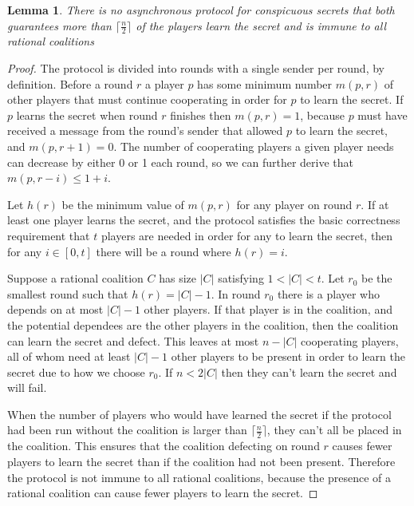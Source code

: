 \documentclass{dalcsthesis}
\newtheorem{lemma}{Lemma}
\begin{document}
\begin{lemma} There is no asynchronous protocol for conspicuous secrets that both guarantees more than $\lceil \frac{n}{2} \rceil$ of the players learn the secret and is immune to all rational coalitions \label{Lem:Async:NoConspGoodRatImmune} \end{lemma}
\begin{proof}
The protocol is divided into rounds with a single sender per round, by definition. Before a round $r$ a player $p$ has some minimum number $m(p, r)$ of other players that must continue cooperating in order for $p$ to learn the secret. If $p$ learns the secret when round $r$ finishes then $m(p, r) = 1$, because $p$ must have received a message from the round's sender that allowed $p$ to learn the secret, and $m(p, r+1) = 0$. The number of cooperating players a given player needs can decrease by either 0 or 1 each round, so we can further derive that $m(p, r-i) \leq 1+i$.

Let $h(r)$ be the minimum value of $m(p, r)$ for any player on round $r$. If at least one player learns the secret, and the protocol satisfies the basic correctness requirement that $t$ players are needed in order for any to learn the secret, then for any $i \in [0, t]$ there will be a round where $h(r) = i$.

Suppose a rational coalition $C$ has size $|C|$ satisfying $1 < |C| < t$. Let $r_0$ be the smallest round such that $h(r) = |C|-1$. In round $r_0$ there is a player who depends on at most $|C|-1$ other players. If that player is in the coalition, and the potential dependees are the other players in the coalition, then the coalition can learn the secret and defect. This leaves at most $n-|C|$ cooperating players, all of whom need at least $|C|-1$ other players to be present in order to learn the secret due to how we choose $r_0$. If $n < 2 |C|$ then they can't learn the secret and will fail.

When the number of players who would have learned the secret if the protocol had been run without the coalition is larger than $\lceil \frac{n}{2} \rceil$, they can't all be placed in the coalition. This ensures that the coalition defecting on round $r$ causes fewer players to learn the secret than if the coalition had not been present. Therefore the protocol is not immune to all rational coalitions, because the presence of a rational coalition can cause fewer players to learn the secret.
\end{proof}
\end{document}
